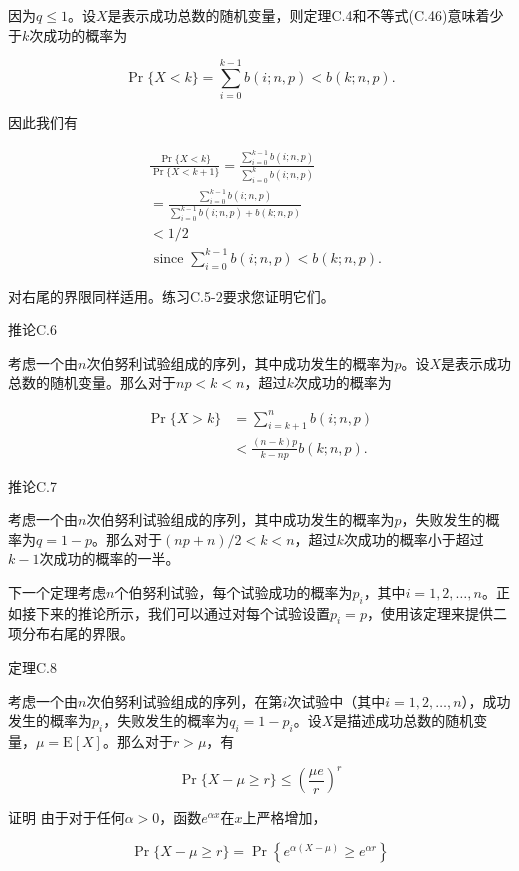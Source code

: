 \documentclass[lang=cn,newtx,10pt,scheme=chinese]{elegantbook}
\begin{document}
因为$q \leq 1$。设$X$是表示成功总数的随机变量，则定理C.4和不等式(C.46)意味着少于$k$次成功的概率为

$$
\operatorname{Pr}\{X<k\}=\sum_{i=0}^{k-1} b(i ; n, p)<b(k ; n, p) .
$$

因此我们有

$$
\begin{aligned}
& \frac{\operatorname{Pr}\{X<k\}}{\operatorname{Pr}\{X<k+1\}}=\frac{\sum_{i=0}^{k-1} b(i ; n, p)}{\sum_{i=0}^k b(i ; n, p)} \\
&=\frac{\sum_{i=0}^{k-1} b(i ; n, p)}{\sum_{i=0}^{k-1} b(i ; n, p)+b(k ; n, p)} \\
&<1 / 2 \\
& \text { since } \sum_{i=0}^{k-1} b(i ; n, p)<b(k ; n, p) .
\end{aligned}
$$

对右尾的界限同样适用。练习C.5-2要求您证明它们。

推论C.6

考虑一个由$n$次伯努利试验组成的序列，其中成功发生的概率为$p$。设$X$是表示成功总数的随机变量。那么对于$n p<k<n$，超过$k$次成功的概率为

$$
\begin{aligned}
\operatorname{Pr}\{X>k\} & =\sum_{i=k+1}^n b(i ; n, p) \\
& <\frac{(n-k) p}{k-n p} b(k ; n, p) .
\end{aligned}
$$

推论C.7

考虑一个由$n$次伯努利试验组成的序列，其中成功发生的概率为$p$，失败发生的概率为$q=1-p$。那么对于$(n p+n) / 2<k<n$，超过$k$次成功的概率小于超过$k-1$次成功的概率的一半。

下一个定理考虑$n$个伯努利试验，每个试验成功的概率为$p_i$，其中$i=1,2, \ldots, n$。正如接下来的推论所示，我们可以通过对每个试验设置$p_i=p$，使用该定理来提供二项分布右尾的界限。

定理C.8

考虑一个由$n$次伯努利试验组成的序列，在第$i$次试验中（其中$i=1,2, \ldots, n$），成功发生的概率为$p_i$，失败发生的概率为$q_i=1-p_i$。设$X$是描述成功总数的随机变量，$\mu=\mathrm{E}[X]$。那么对于$r>\mu$，有

$$
\operatorname{Pr}\{X-\mu \geq r\} \leq\left(\frac{\mu e}{r}\right)^r
$$

证明 由于对于任何$\alpha>0$，函数$e^{\alpha x}$在$x$上严格增加，

$$
\operatorname{Pr}\{X-\mu \geq r\}=\operatorname{Pr}\left\{e^{\alpha(X-\mu)} \geq e^{\alpha r}\right\}
$$
\end{document}
